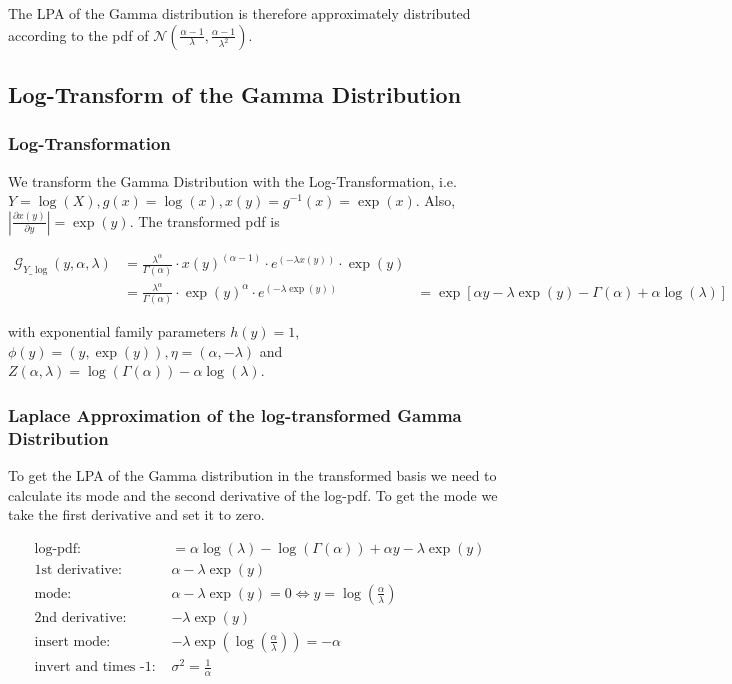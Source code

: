 The LPA of the Gamma distribution is therefore approximately distributed according to the pdf of $\mathcal{N}(\frac{\alpha - 1}{\lambda}, \frac{\alpha-1}{\lambda^2})$.


\subsection{Log-Transform of the Gamma Distribution}

\subsubsection{Log-Transformation}

We transform the Gamma Distribution with the Log-Transformation, i.e. $Y = \log(X), g(x) = \log(x), x(y) = g^{-1}(x) = \exp(x)$. Also, $\left\vert \frac{\partial x(y)}{\partial y}\right\vert = \exp(y)$. The transformed pdf is

\begin{align}
\mathcal{G}_{Y\_\log }(y, \alpha, \lambda) &= \frac{\lambda^\alpha}{\Gamma(\alpha)} \cdot x(y)^{(\alpha - 1)} \cdot e^{(-\lambda x(y))} \cdot \exp(y) \\ \nonumber
&=\frac{\lambda^\alpha}{\Gamma(\alpha)} \cdot \exp(y)^{\alpha} \cdot e^{(-\lambda \exp(y))}
&= \exp\left[\alpha y - \lambda\exp(y) - \Gamma(\alpha) + \alpha\log(\lambda) \right]
\end{align}

with exponential family parameters $h(y) = 1$, $\phi(y) = (y, \exp(y)), \eta = (\alpha, -\lambda)$ and $Z(\alpha, \lambda) = \log(\Gamma(\alpha)) - \alpha  \log(\lambda)$. 


\subsubsection{Laplace Approximation of the log-transformed Gamma Distribution}

To get the LPA of the Gamma distribution in the transformed basis we need to calculate its mode and the second derivative of the log-pdf. To get the mode we take the first derivative and set it to zero. 

\begin{align*}
\text{log-pdf: } &= \alpha \log(\lambda) - \log(\Gamma(\alpha)) + \alpha y - \lambda \exp(y)\\
\text{1st derivative: }&  \alpha - \lambda \exp(y)\\
\text{mode: }& \alpha - \lambda \exp(y) = 0 \Leftrightarrow y = \log\left(\frac{\alpha}{\lambda}\right)\\
\text{2nd derivative: }&  -\lambda \exp(y)\\
\text{insert mode: }& -\lambda \exp(\log\left(\frac{\alpha}{\lambda}\right)) = -\alpha \\
\text{invert and times -1: }&\sigma^2 = \frac{1}{\alpha}
\end{align*}

